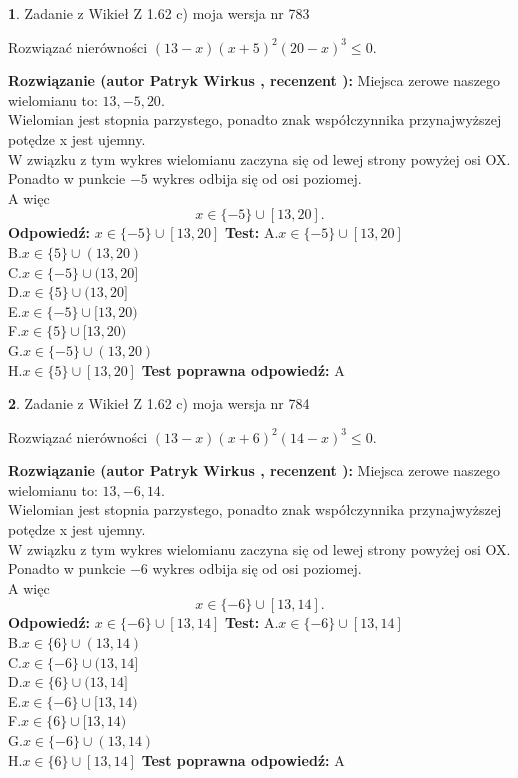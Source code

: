 \documentclass[12pt, a4paper]{article}
\theoremstyle{definition} %
\newtheorem{zad}{}
\newcommand{\zadStart}[1]{\begin{zad}#1\newline}
\newcommand{\zadStop}{\end{zad}}
\newcommand{\rozwStart}[2]{\noindent \textbf{Rozwiązanie (autor #1 , recenzent #2): }\newline}
\newcommand{\rozwStop}{\newline}
\newcommand{\odpStart}{\noindent \textbf{Odpowiedź:}\newline}
\newcommand{\odpStop}{\newline}
\newcommand{\testStart}{\noindent \textbf{Test:}\newline}
\newcommand{\testStop}{\newline}
\newcommand{\kluczStart}{\noindent \textbf{Test poprawna odpowiedź:}\newline}
\newcommand{\kluczStop}{\newline}
\begin{document}
\zadStart{Zadanie z Wikieł Z 1.62 c) moja wersja nr 783}

Rozwiązać nierówności $(13-x)(x+5)^{2}(20-x)^{3}\le0$.
\zadStop
\rozwStart{Patryk Wirkus}{}
Miejsca zerowe naszego wielomianu to: $13, -5, 20$.\\
Wielomian jest stopnia parzystego, ponadto znak współczynnika przy\linebreak najwyższej potędze x jest ujemny.\\ W związku z tym wykres wielomianu zaczyna się od lewej strony powyżej osi OX.\\
Ponadto w punkcie $-5$ wykres odbija się od osi poziomej.\\
A więc $$x \in \{-5\} \cup [13,20].$$
\rozwStop
\odpStart
$x \in \{-5\} \cup [13,20]$
\odpStop
\testStart
A.$x \in \{-5\} \cup [13,20]$\\
B.$x \in \{5\} \cup (13,20)$\\
C.$x \in \{-5\} \cup (13,20]$\\
D.$x \in \{5\} \cup (13,20]$\\
E.$x \in \{-5\} \cup [13,20)$\\
F.$x \in \{5\} \cup [13,20)$\\
G.$x \in \{-5\} \cup (13,20)$\\
H.$x \in \{5\} \cup [13,20]$
\testStop
\kluczStart
A
\kluczStop



\zadStart{Zadanie z Wikieł Z 1.62 c) moja wersja nr 784}

Rozwiązać nierówności $(13-x)(x+6)^{2}(14-x)^{3}\le0$.
\zadStop
\rozwStart{Patryk Wirkus}{}
Miejsca zerowe naszego wielomianu to: $13, -6, 14$.\\
Wielomian jest stopnia parzystego, ponadto znak współczynnika przy\linebreak najwyższej potędze x jest ujemny.\\ W związku z tym wykres wielomianu zaczyna się od lewej strony powyżej osi OX.\\
Ponadto w punkcie $-6$ wykres odbija się od osi poziomej.\\
A więc $$x \in \{-6\} \cup [13,14].$$
\rozwStop
\odpStart
$x \in \{-6\} \cup [13,14]$
\odpStop
\testStart
A.$x \in \{-6\} \cup [13,14]$\\
B.$x \in \{6\} \cup (13,14)$\\
C.$x \in \{-6\} \cup (13,14]$\\
D.$x \in \{6\} \cup (13,14]$\\
E.$x \in \{-6\} \cup [13,14)$\\
F.$x \in \{6\} \cup [13,14)$\\
G.$x \in \{-6\} \cup (13,14)$\\
H.$x \in \{6\} \cup [13,14]$
\testStop
\kluczStart
A
\kluczStop
\end{document}
